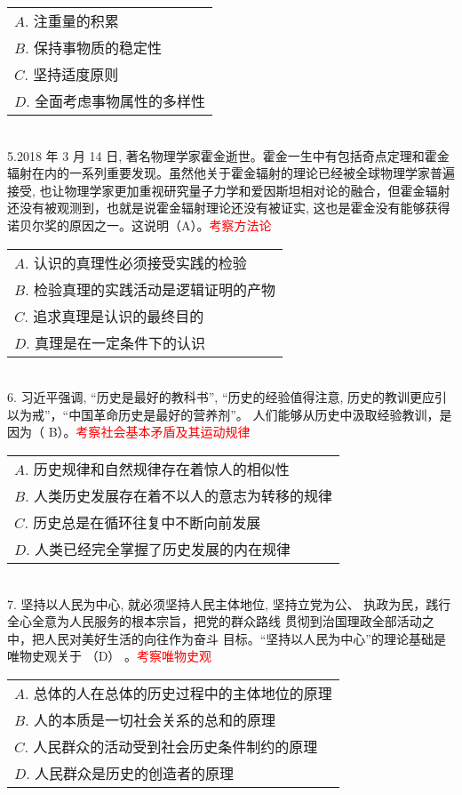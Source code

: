 \documentclass[a4paper,12pt]{article}
\begin{document}
\noindent\begin{tabular}{l}
$ A $. 注重量的积累\\
$ B $. 保持事物质的稳定性\\
$ C $. 坚持适度原则\\
$ D $. 全面考虑事物属性的多样性\\
\end{tabular}\\


5.2018 年 3 月 14 日, 著名物理学家霍金逝世。霍金一生中有包括奇点定理和霍金辐射在内的一系列重要发现。虽然他关于霍金辐射的理论已经被全球物理学家普遍接受, 也让物理学家更加重视研究量子力学和爱因斯坦相对论的融合，但霍金辐射还没有被观测到，也就是说霍金辐射理论还没有被证实, 这也是霍金没有能够获得诺贝尔奖的原因之一。这说明（A）。\textcolor{red}{考察方法论}

\noindent\begin{tabular}{l}
$ A $. 认识的真理性必须接受实践的检验\\
$ B $. 检验真理的实践活动是逻辑证明的产物\\
$ C $. 追求真理是认识的最终目的\\
$ D $. 真理是在一定条件下的认识\\
\end{tabular}\\


6. 习近平强调, “历史是最好的教科书”, “历史的经验值得注意,  历史的教训更应引以为戒”，“中国革命历史是最好的营养剂”。 人们能够从历史中汲取经验教训，是因为（ B）。\textcolor{red}{考察社会基本矛盾及其运动规律}

\noindent\begin{tabular}{l}
$ A $. 历史规律和自然规律存在着惊人的相似性\\
$ B $. 人类历史发展存在着不以人的意志为转移的规律\\
$ C $. 历史总是在循环往复中不断向前发展\\
$ D $. 人类已经完全掌握了历史发展的内在规律\\
\end{tabular}\\

7. 坚持以人民为中心, 就必须坚持人民主体地位, 坚持立党为公、  执政为民，践行全心全意为人民服务的根本宗旨，把党的群众路线 贯彻到治国理政全部活动之中，把人民对美好生活的向往作为奋斗 目标。“坚持以人民为中心”的理论基础是唯物史观关于 （D） 。\textcolor{red}{考察唯物史观}


\noindent\begin{tabular}{l}
$ A $.  总体的人在总体的历史过程中的主体地位的原理\\
$ B $. 人的本质是一切社会关系的总和的原理\\
$ C $. 人民群众的活动受到社会历史条件制约的原理\\
$ D $. 人民群众是历史的创造者的原理\\
\end{tabular}\\
\end{document}

